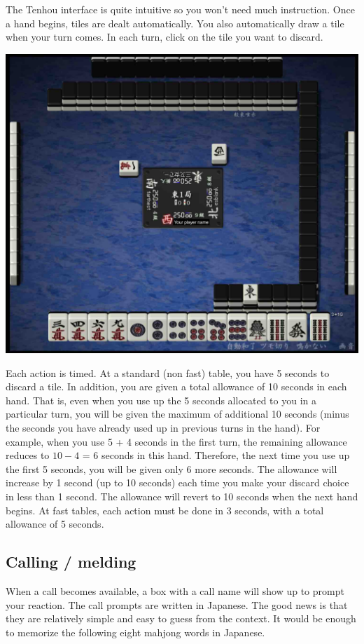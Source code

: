 \bigskip
The {\jap Tenhou} interface is quite intuitive so you won't need much instruction.
Once a hand begins, tiles are dealt automatically. You also automatically draw a tile when your turn comes.
In each turn, click on the tile you want to discard.

\begin{center}
\includegraphics[width=.6\textwidth,clip]{figs/interface.jpg}
\end{center}
\vspace{-25pt}

\bigskip
Each action is timed. At a standard (non fast) table, you have 5 seconds to discard a tile. In addition, you are given a total allowance of 10 seconds in each hand. That is, even when you use up the 5 seconds allocated to you in a particular turn, you will be given the maximum of additional 10 seconds (minus the seconds you have already used up in previous turns in the hand). For example, when you use 5 + 4 seconds in the first turn, the remaining allowance reduces to $10 - 4$ = 6 seconds in this hand. Therefore, the next time you use up the first 5 seconds, you will be given only 6 more seconds. The allowance will increase by 1 second (up to 10 seconds) each time you make your discard choice in less than 1 second. The allowance will revert to 10 seconds when the next hand begins. At fast tables, each action must be done in 3 seconds, with a total allowance of 5 seconds.

\subsection{Calling / melding}
When a call becomes available, a box with a call name will show up to prompt your reaction.
The call prompts are written in Japanese. The good news is that they are relatively simple and easy to guess from the context. It would be enough to memorize the following eight mahjong words in Japanese.

